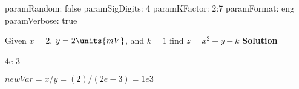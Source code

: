 
paramRandom: false
paramSigDigits: 4
paramKFactor: 2:7
paramFormat: eng
paramVerbose: true



\question Given \mbox{$x = 2$}, \mbox{$y = \mbox{$2 \units{m V}$}$}, and \mbox{$k = 1$} find $z = x^2+y-k$
\textbf{Solution}
\\ 

4e-3

\mbox{$newVar = x/y  =  (2)/(2e-3) = 1e3$}

